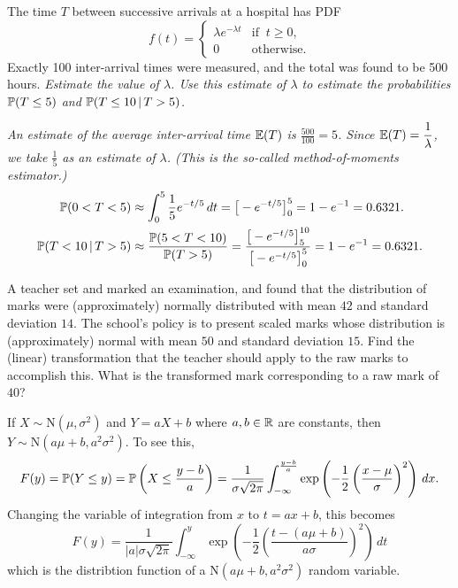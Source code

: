 \begin{exercise}
\begin{questions}
\question
The time $T$ between successive arrivals at a hospital has PDF
\[
f(t) = \begin{cases}
	\lambda e^{-\lambda t} 	& \text{if }\ t\geq 0,\\
	0		  				& \text{otherwise.}		
\end{cases}
\]
Exactly 100 inter-arrival times were measured, and the total was found to be 500 hours.
\ben
\it Estimate the value of $\lambda$.
\it Use this estimate of $\lambda$ to estimate the probabilities $\mathbb{P}(T\leq 5)$ and $\mathbb{P}(T\leq 10\,|\, T > 5)$.
\een
\begin{answer}
\ben
\it %
An estimate of the average inter-arrival time $\mathbb{E}(T)$ is $\displaystyle\frac{500}{100} = 5$. Since $\mathbb{E}(T)=\displaystyle\frac{1}{\lambda}$, we take $\displaystyle\frac{1}{5}$ as an estimate of $\lambda$. (This is the so-called \emph{method-of-moments} estimator.)
\it %
\begin{align*}
\mathbb{P}(0<T<5)
	& \approx \int_0^5\frac{1}{5}e^{-t/5}\,dt 
	= \big[-e^{-t/5}\big]_0^5 
	= 1 - e^{-1} 
	= 0.6321. \\
\mathbb{P}(T<10\,|\,T>5)
	& \approx \frac{\mathbb{P}(5<T<10)}{\mathbb{P}(T>5)} 
	= \frac{\big[-e^{-t/5}\big]_5^{10}}{\big[-e^{-t/5}\big]_0^5}
	= 1 - e^{-1} 
	= 0.6321. 
\end{align*}
\een
\end{answer}

\question
A teacher set and marked an examination, and found that the distribution of marks were (approximately) normally distributed with mean $42$ and standard deviation $14$. The school's policy is to present scaled marks whose distribution is (approximately) normal with mean $50$ and standard deviation $15$. Find the (linear) transformation that the teacher should apply to the raw marks to accomplish this. What is the transformed mark corresponding to a raw mark of $40$?
\begin{answer}
If $X\sim\text{N}(\mu,\sigma^2)$ and $Y=aX+b$ where $a,b\in\mathbb{R}$ are constants, then $Y\sim\text{N}(a\mu+b,a^2\sigma^2)$. To see this,
\[
F(y) = \mathbb{P}(Y\leq y) 
	 = \mathbb{P}\left(X\leq\frac{y-b}{a}\right) 
	  = \frac{1}{\sigma\sqrt{2\pi}} \int_{-\infty}^{\frac{y-b}{a}} \exp\left(-\frac{1}{2}\left(\frac{x-\mu}{\sigma}\right)^2\right)\,dx.
\]
Changing the variable of integration from $x$ to $t = ax + b$, this becomes
\[
F(y)  = \frac{1}{|a|\sigma\sqrt{2\pi}} \int_{-\infty}^{y} \exp\left(-\frac{1}{2}\left(\frac{t-(a\mu+b)}{a\sigma}\right)^2\right)\,dt 
\]
which is the distribtion function of a $\text{N}(a\mu+b,a^2\sigma^2)$ random variable.


\end{answer}
\end{questions}
\end{exercise}
